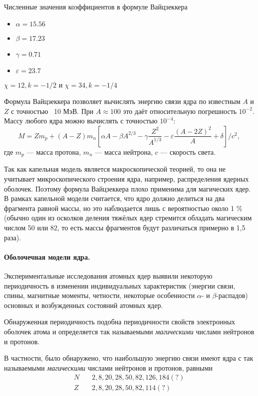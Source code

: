 \documentclass[a5paper,openany]{book}
\begin{document}
Численные значения коэффициентов в формуле Вайцзеккера
\begin{itemize}
	\item $\alpha =15.56$
	\item $\beta =17.23$
	\item $\gamma =0.71$
	\item $\varepsilon =23.7$
\end{itemize}
$ \chi =12, k=-1/2$ и 
$ \chi =34, k=-1/4$


Формула Вайцзеккера позволяет вычислять энергию связи ядра по известным $A$ и $Z$ с точностью ~10 МэВ. При $A\approx 100$ это даёт относительную погрешность $10^{-2}$. Массу любого ядра можно вычислять с точностью $10^{-4}$:
\begin{equation}
	M = Z m_{p}+(A-Z) m_{n}\left[\alpha A-\beta A^{2/3} -\gamma {\frac {Z^{2}}{A^{1/3}}}-\varepsilon {\frac {(A-2Z)^{2}}{A}}+\delta \right]/c^{2},
\end{equation}	
где $m_{p}$ --- масса протона, $m_{n}$ --- масса нейтрона, $c$ --- скорость света.

Так как капельная модель является макроскопической теорией,
то она не учитывает микроскопического строения ядра, например, распределения ядерных оболочек.
Поэтому формула Вайцзеккера плохо применима для магических ядер.
В рамках капельной модели считается, что ядро должно делиться на два фрагмента равной массы,
но это наблюдается лишь с вероятностью около 1 \%
(обычно один из осколков деления тяжёлых ядер стремится обладать магическим числом 50 или 82,
то есть массы фрагментов будут различаться примерно в 1,5 раза).

\paragraph{Оболочечная модели ядра.}
Экспериментальные исследования атомных ядер выявили некоторую периодичность в изменении
индивидуальных характеристик (энергии связи, спины, магнитные моменты, четности, некоторые особенности $\alpha$- и $\beta$-распадов) основных и возбужденных состояний атомных ядер. 

Обнаруженная периодичность подобна периодичности свойств электронных оболочек атома и определяется так называемыми \emph{магическими} числами нейтронов и протонов. 

В частности, было обнаружено, что наибольшую энергию связи имеют ядра с так называемыми \emph{магическими} числами нейтронов и протонов, равными 
\begin{align}
		N & \quad 2, 8, 20, 28, 50, 82, 126, 184(?) \label{MagicN} \\
		Z & \quad 2, 8, 20, 28, 50, 82, 114(?) \label{MagicP}
\end{align}
\end{document}
